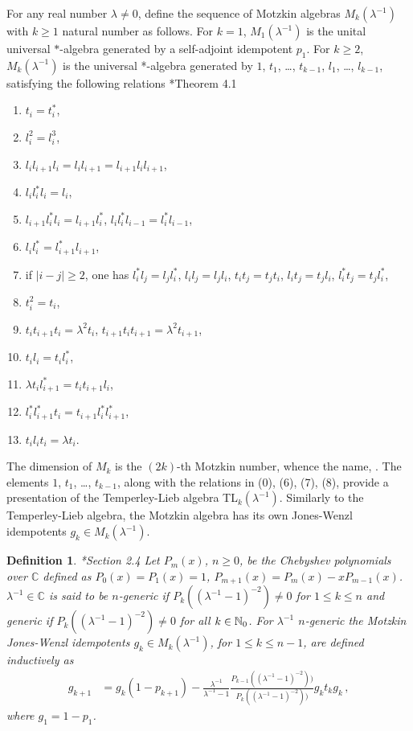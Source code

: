 \documentclass[12pt, a4paper]{amsart}
\newcommand{\IC}[0]{\mathbb{C}} \newcommand{\ID}[0]{\mathbb{D}}
\newtheorem{definition}[theorem]{Definition}
\numberwithin{equation}{section}
\begin{document}
For any real number $\lambda\neq 0$, define the sequence of Motzkin algebras $M_k(\lambda^{-1})$ with $k\geq 1$ natural number as follows.
For $k=1$,  $M_1(\lambda^{-1})$ is the unital universal $*$-algebra generated by a self-adjoint idempotent $p_1$.  
For $k\geq 2$, $M_k(\lambda^{-1})$ is the universal *-algebra generated by $1$, $t_1$, \ldots, $t_{k-1}$, $l_1$, \ldots, $l_{k-1}$, satisfying the following relations \cite{Ly}*{Theorem 4.1}
\begin{enumerate}[start = 0] \label{relations-motzkin}
\item $t_i=t_i^*$,
\item $l_i^2=l_i^3$,
\item $l_i l_{i+1} l_i = l_i l_{i+1} = l_{i+1} l_i l_{i+1}$,
\item $l_{i} l_{i}^* l_{i} = l_{i}$,
\item $l_{i+1} l_{i}^* l_{i} = l_{i+1} l_{i}^* $, $l_{i} l_{i}^* l_{i-1} = l_{i}^* l_{i-1}$,
\item $l_{i} l_i^* = l_{i+1}^* l_{i+1}$,
\item if $|i-j|\geq 2$, one has $l_{i}^* l_{j} = l_j l_i^*$, $l_il_j=l_jl_i$,  $t_it_j=t_jt_i$,
$l_i t_j=t_jl_i$, $l_i^* t_j=t_jl_i^*$, 
\item $t_i^2=t_i$,
\item $t_it_{i+1}t_i=\lambda^{2} t_i$, $t_{i+1}t_{i}t_{i+1}=\lambda^{2} t_{i+1}$, 
\item $t_il_i = t_i l_i^*$,
\item $\lambda t_i l_{i+1}^* = t_i t_{i+1} l_i$,
\item $l_i^* l_{i+1}^* t_i = t_{i+1} l_i^* l _{i+1}^*$,
\item $t_i l_i t_i = \lambda t_i$.
\end{enumerate}
The dimension of  $M_k$ is the $(2k)$-th Motzkin number, whence the name, \cite{Halverson}.
 The elements $1$, $t_1$, \ldots, $t_{k-1}$, along with the relations in (0), (6), (7), (8), provide a presentation of the Temperley-Lieb algebra TL$_k(\lambda^{-1})$. 
Similarly to the Temperley-Lieb algebra, the Motzkin algebra has its 
  own Jones-Wenzl idempotents $g_k\in M_k(\lambda^{-1})$. 
\begin{definition}\cite{Jo21}*{Section 2.4}
 Let $P_m(x)$, $n\geq 0$,  be the Chebyshev polynomials over $\IC$ defined as $P_0(x)=P_1(x)=1$, $P_{m+1}(x)=P_m(x)-xP_{m-1}(x)$. 
$\lambda^{-1}\in \IC$ is said to be $n$-generic if $P_k((\lambda^{-1}-1)^{-2})\neq 0$ for $1\leq k \leq n$ and generic if $P_k((\lambda^{-1}-1)^{-2})\neq 0$ for all $k\in\mathbb{N}_0$.
For $\lambda^{-1}$ $n$-generic the Motzkin Jones-Wenzl idempotents $g_k\in M_k(\lambda^{-1})$, for $1\leq k \leq n-1$, are defined inductively as 
\begin{align*}\label{recurrence-formula}
g_{k+1}&=g_k(1-p_{k+1})-\frac{\lambda^{-1}}{\lambda^{-1}-1} \frac{P_{k-1}((\lambda^{-1}-1)^{-2}))}{P_k((\lambda^{-1}-1)^{-2}))} g_k t_kg_k\,,
\end{align*}
where $g_1=1-p_1$.
\end{definition}
\end{document}

